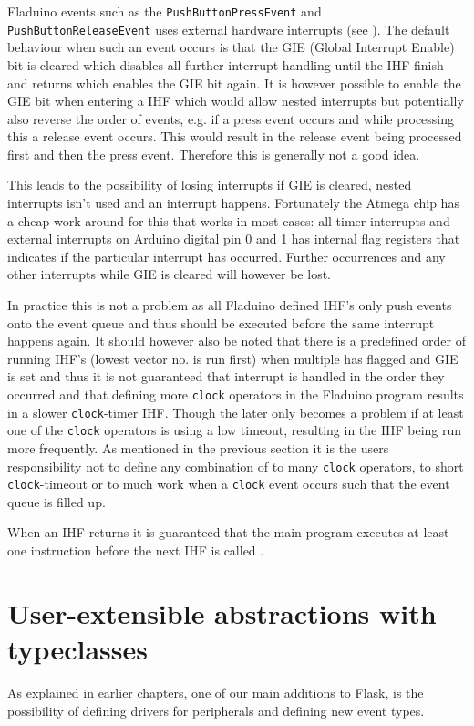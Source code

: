 \documentclass[a4paper, oneside, final]{memoir}
\let\fref\undefined
\begin{document}
Fladuino events such as the \texttt{PushButtonPressEvent} and
\texttt{PushButtonReleaseEvent} uses external hardware interrupts (see
\fref{sec:external-interrupts}). The default behaviour when such an event occurs
is that the GIE (Global Interrupt Enable) bit is cleared which disables all
further interrupt handling until the IHF finish and returns which enables the
GIE bit again. It is however possible to enable the GIE bit when entering a IHF
which would allow nested interrupts \cite[Section 4.7 page 14]{atmel8p} but
potentially also reverse the order of events, e.g. if a press event occurs and
while processing this a release event occurs. This would result in the release
event being processed first and then the press event. Therefore this is
generally not a good idea.

This leads to the possibility of losing interrupts if GIE is cleared, nested
interrupts isn't used and an interrupt happens. Fortunately the Atmega chip has
a cheap work around for this that works in most cases: all timer interrupts and
external interrupts on Arduino digital pin 0 and 1 has internal flag registers
that indicates if the particular interrupt has occurred. Further occurrences and
any other interrupts while GIE is cleared will however be lost.

In practice this is not a problem as all Fladuino defined IHF's only push events
onto the event queue and thus should be executed before the same interrupt
happens again. It should however also be noted that there is a predefined order
of running IHF's \cite[Section 9 page 57]{atmel8p} (lowest vector no. is run
first) when multiple has flagged and GIE is set and thus it is not guaranteed
that interrupt is handled in the order they occurred and that defining more
\texttt{clock} operators in the Fladuino program results in a slower
\texttt{clock}-timer IHF. Though the later only becomes a problem if at least
one of the \texttt{clock} operators is using a low timeout, resulting in the IHF
being run more frequently. As mentioned in the previous section it is the users
responsibility not to define any combination of to many \texttt{clock}
operators, to short \texttt{clock}-timeout or to much work when a \texttt{clock}
event occurs such that the event queue is filled up.

When an IHF returns it is guaranteed that the main program executes at least
one instruction before the next IHF is called \cite[Section 4.7 page 14]{atmel8p}.


\section{User-extensible abstractions with typeclasses}
As explained in earlier chapters, one of our main additions to Flask,
is the possibility of defining drivers for peripherals and defining
new event types.
\end{document}
